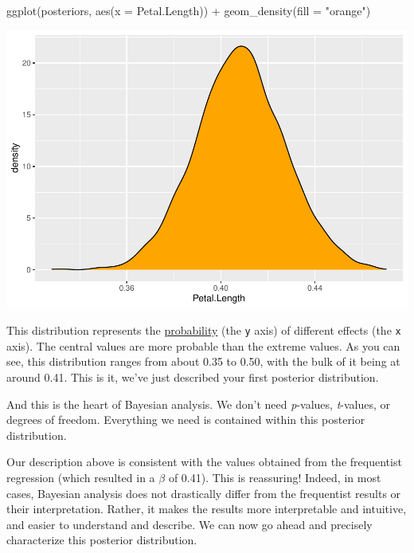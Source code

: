 \documentclass[10pt,a4paper,onecolumn]{article}
\newenvironment{Shaded}{\begin{snugshade}}{\end{snugshade}}
\newcommand{\AttributeTok}[1]{\textcolor[rgb]{0.77,0.63,0.00}{#1}}
\newcommand{\FunctionTok}[1]{\textcolor[rgb]{0.00,0.00,0.00}{#1}}
\newcommand{\NormalTok}[1]{#1}
\newcommand{\SpecialCharTok}[1]{\textcolor[rgb]{0.00,0.00,0.00}{#1}}
\newcommand{\StringTok}[1]{\textcolor[rgb]{0.31,0.60,0.02}{#1}}
\begin{document}
\begin{Shaded}
\begin{Highlighting}[]
\FunctionTok{ggplot}\NormalTok{(posteriors, }\FunctionTok{aes}\NormalTok{(}\AttributeTok{x =}\NormalTok{ Petal.Length)) }\SpecialCharTok{+}
  \FunctionTok{geom\_density}\NormalTok{(}\AttributeTok{fill =} \StringTok{"orange"}\NormalTok{)}
\end{Highlighting}
\end{Shaded}

\includegraphics[width=1\linewidth]{paper_files/figure-latex/unnamed-chunk-10-1}

This distribution represents the
\href{https://en.wikipedia.org/wiki/Probability_density_function}{probability}
(the \texttt{y} axis) of different effects (the \texttt{x} axis). The
central values are more probable than the extreme values. As you can
see, this distribution ranges from about 0.35 to 0.50, with the bulk of
it being at around 0.41. This is it, we've just described your first
posterior distribution.

And this is the heart of Bayesian analysis. We don't need
\emph{p}-values, \emph{t}-values, or degrees of freedom. Everything we
need is contained within this posterior distribution.

Our description above is consistent with the values obtained from the
frequentist regression (which resulted in a \(\beta\) of 0.41). This is
reassuring! Indeed, in most cases, Bayesian analysis does not
drastically differ from the frequentist results or their interpretation.
Rather, it makes the results more interpretable and intuitive, and
easier to understand and describe. We can now go ahead and precisely
characterize this posterior distribution.
\end{document}
